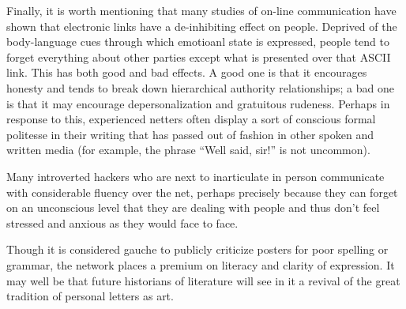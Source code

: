 Finally, it is worth mentioning that many studies of on-line communication have shown that electronic links have a de-inhibiting effect on
people. Deprived of the body-language cues through which emotioanl state is expressed, people tend to forget everything about other parties
except what is presented over that ASCII link. This has both good and bad effects. A good one is that it encourages honesty and tends to
break down hierarchical authority relationships; a bad one is that it may encourage depersonalization and gratuitous rudeness. Perhaps in
response to this, experienced netters often display a sort of conscious formal politesse in their writing that has passed out of fashion in
other spoken and written media (for example, the phrase ``Well said, sir!'' is not uncommon).

Many introverted hackers who are next to inarticulate in person communicate with considerable fluency over the net, perhaps precisely
because they can forget on an unconscious level that they are dealing with people and thus don't feel stressed and anxious as they would
face to face.

Though it is considered gauche to publicly criticize posters for poor spelling or grammar, the network places a premium on literacy and
clarity of expression. It may well be that future historians of literature will see in it a revival of the great tradition of personal
letters as art.

